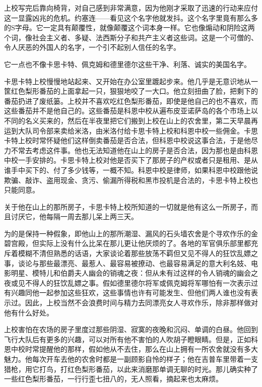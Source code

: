     上校写完后靠向椅背，对自己感到非常满意，因为他刚才采取了迅速的行动来应付这一显露凶兆的危机。约塞连——看见这个名字他就发抖。这个名字里竟有那么多的S字母。它一定具有颠覆性，就像颠覆这个词本身一样。它也像煽动和阴险这两个词，像社会主义者、多疑、法西斯分子和共产主义者这些词。这是一个可僧的、令人厌恶的外国人的名字，一个引不起别人信任的名字。

    它一点也不像卡思卡特、佩克姆和德里德尔这些干净、利落、诚实的美国名字。

    卡思卡特上校慢慢地站起来、又开始在办公室里踱起步来。他几乎是无意识地从一筐红色梨形番茄的上面拿起一只，狠狠地咬了一大口。他立刻扭曲了脸，把剩下的番茄扔进了废纸篓。上校并不喜欢吃红色梨形番茄，即使是他自己的也不喜欢，而这些番茄并不是他自己的。这些番茄是科恩中校从遍布皮亚诺萨岛的各个市场上以不同的名义买来的，然后在半夜里把它们搬到上校在山上的农舍里，第二天早晨再运到大队司令部来卖给米洛，由米洛付给卡思卡特上校和科恩中校一些佣金。卡思卡特上校时常怀疑他们这样倒卖番茄是否合法，但科恩中校说这事合法，于是他尽力不常去考虑这件事。他也无法知道他在山上的房子是否合法，因为那也是由科恩中校一手安排的。卡思卡特上校对他是否买下了那房子的产权或者只是租用、是从谁手中买下的、付了多少钱等，一概不知。科恩中校是律师，如果科恩中校跟他说欺骗、敲诈、盗用现金、贪污、偷漏所得税和黑市投机是合法的，卡思卡特上校也只能同意。

    关于他在山上的那所房子，卡思卡特上校所知道的一切就是他有这么一所房子，而且讨厌它，他每隔一周去那儿呆上两三天。

 


    为的是保持一种假象，即他山上的那所潮湿、漏风的石头墙农舍是个寻欢作乐的金碧宫殿，但实际上没有什么比呆在那儿更让他厌烦的了。各地的军官俱乐部里都充斥着模糊不清但熟悉的话语，大家谈论着那些放荡不羁但又见不得人的狂饮乱嫖之事，谈论与那些最漂亮、最惹人、最容易被撩动、也最容易满足的意大利名妓、电影明星、模特儿和伯爵夫人幽会的销魂之夜：但从未有过这样的令人销魂的幽会之夜或见不得人的狂饮乱嫖之事。假如德里德尔将军或佩克姆将军哪怕有一次表示过有兴趣同他一起参加这些狂欢，这些事情也许有可能发生、但他们两人谁也没有表示过。因此，上校当然不会浪费时间与精力去同漂亮女人寻欢作乐，除非那样做对他有什么好处。

    上校害怕在农场的房子里度过那些阴湿、寂寞的夜晚和沉闷、单调的白昼。他回到飞行大队后有更多的兴趣，可以对所有他不害怕的人吹胡子瞪眼睛。但是，正如科恩中校时常提醒他的那样，假如他从不去住，那么在山上拥有一所农舍就没有多大魅力。他每次开车去他的农舍时都是一副顾影自怜的样子；他在吉普车里带着一支猎枪，用它打鸟，打红色梨形番茄，以此来消磨那单调无聊的时光。那儿确实种了一些红色梨形番茄，一行行歪七扭八的，无人照看，摘起来也太麻烦。


